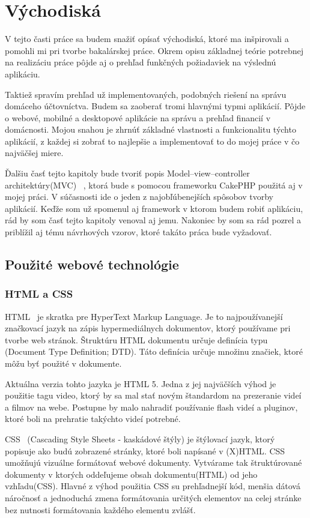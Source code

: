 \documentclass[12pt]{book}
\begin{document}
\chapter{Východiská}\label{chap:background}
V tejto časti práce sa budem snažiť opísať východiská, ktoré ma inšpirovali a pomohli mi pri tvorbe bakalárskej práce. Okrem opisu základnej teórie potrebnej na realizáciu práce pôjde aj o prehľad funkčných požiadaviek na výslednú aplikáciu.

Taktiež spravím prehľad už implementovaných, podobných riešení na správu domáceho účtovníctva. Budem sa zaoberať tromi hlavnými typmi aplikácií. Pôjde o webové, mobilné a desktopové aplikácie na správu a prehľad financií v domácnosti. Mojou snahou je zhrnúť základné vlastnosti a funkcionalitu týchto aplikácií, z každej si zobrať to najlepšie a implementovať to do mojej práce v čo najväčšej miere.

Ďalšiu časť tejto kapitoly bude tvoriť popis Model–view–controller architektúry(MVC) \cite{UvodMVC}\ , ktorá bude s pomocou frameworku CakePHP použitá aj v mojej práci. V súčasnosti ide o jeden z najobľúbenejších spôsobov tvorby aplikácií. Keďže som už spomenul aj framework v ktorom budem robiť aplikáciu, rád by som časť tejto kapitoly venoval aj jemu.
Nakoniec by som sa rád pozrel a priblížil aj tému návrhových vzorov, ktoré takáto práca bude vyžadovať.\newpage



\section{Použité webové technológie}
\subsection{HTML a CSS}
HTML \cite{HTML}\ je skratka pre HyperText Markup Language. Je to najpoužívanejší značkovací jazyk na zápis hypermediálnych dokumentov, ktorý používame pri tvorbe web stránok. Štruktúru HTML dokumentu určuje definícia typu (Document Type Definition; DTD). Táto definícia určuje množinu značiek, ktoré môžu byť použité v dokumente. 

Aktuálna verzia tohto jazyka je HTML 5. Jedna z jej najväčších výhod je použitie tagu video, ktorý by sa mal stať novým štandardom na prezeranie videí a filmov na webe. Postupne by malo nahradiť používanie flash videí a pluginov, ktoré boli na prehratie takýchto videí potrebné. 

CSS \cite{CSS21}\ (Cascading Style Sheets - kaskádové štýly) je štýlovací jazyk, ktorý popisuje ako budú zobrazené stránky, ktoré boli napísané v (X)HTML. CSS umožňujú vizuálne formátovať webové dokumenty. Vytvárame tak štruktúrované dokumenty v ktorých oddeľujeme obsah dokumentu(HTML) od jeho vzhľadu(CSS). Hlavné z výhod použitia CSS su prehľadnejší kód, menšia dátová náročnosť a jednoduchá zmena formátovania určitých elementov na celej stránke bez nutnosti formátovania každého elementu zvlášť. 
\end{document}
